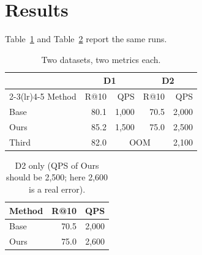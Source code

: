 \documentclass{article}
\begin{document}
\section{Results}
Table~\ref{tab:a} and Table~\ref{tab:b} report the same runs.
\begin{table}[h]\centering\caption{Two datasets, two metrics each.}\label{tab:a}
\begin{tabular}{lrrrr}
\toprule
 & \multicolumn{2}{c}{D1} & \multicolumn{2}{c}{D2} \\
\cmidrule(lr){2-3}\cmidrule(lr){4-5}
Method & R@10 & QPS & R@10 & QPS \\
\midrule
Base & 80.1 & 1,000 & 70.5 & 2,000 \\
Ours & 85.2 & 1,500 & 75.0 & 2,500 \\
Third & 82.0 & \multicolumn{2}{c}{OOM} & 2,100 \\
\bottomrule
\end{tabular}\end{table}
\begin{table}[h]\centering\caption{D2 only (QPS of Ours should be 2,500; here 2,600 is a real error).}\label{tab:b}
\begin{tabular}{lrr}
\toprule
Method & R@10 & QPS \\
\midrule
Base & 70.5 & 2,000 \\
Ours & 75.0 & 2,600 \\
\bottomrule
\end{tabular}\end{table}
\end{document}

